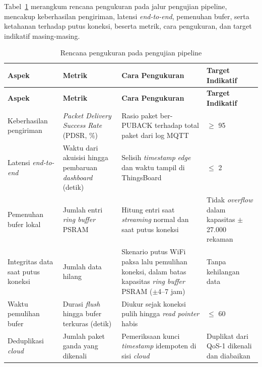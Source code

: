 Tabel~\ref{tab:pengujian-pipeline} merangkum rencana pengukuran pada jalur pengujian pipeline, mencakup keberhasilan pengiriman, latensi \textit{end-to-end}, pemenuhan bufer, serta ketahanan terhadap putus koneksi, beserta metrik, cara pengukuran, dan target indikatif masing-masing.

\begin{center}
  \setlength{\tabcolsep}{4pt}
  \renewcommand{\arraystretch}{1.15}
  \small
  \begin{longtable}{|>{\RaggedRight\arraybackslash}p{2.5cm}|>{\RaggedRight\arraybackslash}p{3.2cm}|>{\RaggedRight\arraybackslash}p{4.6cm}|>{\RaggedRight\arraybackslash}p{2.5cm}|}
    \caption{Rencana pengukuran pada pengujian pipeline}
    \label{tab:pengujian-pipeline} \\
    \hline
    \rowcolor{headgray}
    \textbf{Aspek} & \textbf{Metrik} & \textbf{Cara Pengukuran} & \textbf{Target Indikatif} \\
    \hline
    \endfirsthead
    \hline
    \rowcolor{headgray}
    \textbf{Aspek} & \textbf{Metrik} & \textbf{Cara Pengukuran} & \textbf{Target Indikatif} \\
    \hline
    \endhead
    \hline
    \endfoot
    Keberhasilan pengiriman &
    \textit{Packet Delivery Success Rate} (PDSR, \%) &
    Rasio paket ber-PUBACK terhadap total paket dari log MQTT &
    $\geq$ 95 \\
    \hline
    Latensi \textit{end-to-end} &
    Waktu dari akuisisi hingga pembaruan \textit{dashboard} (detik) &
    Selisih \textit{timestamp} \textit{edge} dan waktu tampil di ThingsBoard &
    $\leq$ 2 \\
    \hline
    Pemenuhan bufer lokal &
    Jumlah entri \textit{ring buffer} PSRAM &
    Hitung entri saat \textit{streaming} normal dan saat putus koneksi &
    Tidak \textit{overflow} dalam kapasitas $\pm$27.000 rekaman \\
    \hline
    Integritas data saat putus koneksi &
    Jumlah data hilang &
    Skenario putus WiFi paksa lalu pemulihan koneksi, dalam batas
    kapasitas \textit{ring buffer} PSRAM ($\pm$4--7 jam) &
    Tanpa kehilangan data \\
    \hline
    Waktu pemulihan bufer &
    Durasi \textit{flush} hingga bufer terkuras (detik) &
    Diukur sejak koneksi pulih hingga \textit{read pointer} habis &
    $\leq$ 60 \\
    \hline
    Deduplikasi \textit{cloud} &
    Jumlah paket ganda yang dikenali &
    Pemeriksaan kunci \textit{timestamp} idempoten di sisi \textit{cloud} &
    Duplikat dari QoS-1 dikenali dan diabaikan \\
    \hline
  \end{longtable}
\end{center}

